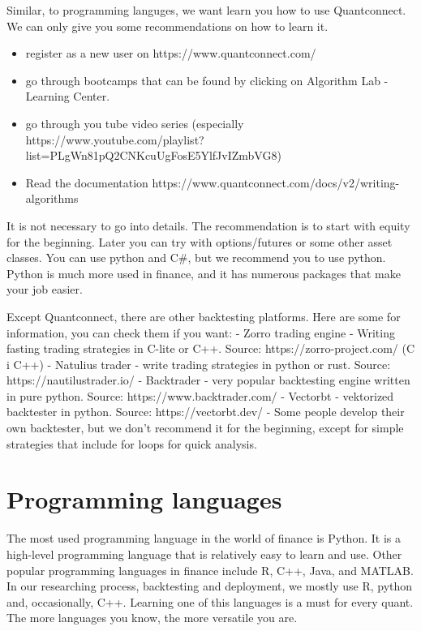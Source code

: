 \documentclass[
  letterpaper,
  DIV=11,
  numbers=noendperiod]{scrreprt}
\providecommand{\tightlist}{%
  \setlength{\itemsep}{0pt}\setlength{\parskip}{0pt}}\usepackage{longtable,booktabs,array}
\begin{document}
Similar, to programming languges, we want learn you how to use
Quantconnect. We can only give you some recommendations on how to learn
it.

\begin{itemize}
\tightlist
\item
  register as a new user on https://www.quantconnect.com/
\item
  go through bootcamps that can be found by clicking on Algorithm Lab -
  Learning Center.
\item
  go through you tube video series (especially
  https://www.youtube.com/playlist?list=PLgWn81pQ2CNKcuUgFosE5YlfJvIZmbVG8)
\item
  Read the documentation
  https://www.quantconnect.com/docs/v2/writing-algorithms
\end{itemize}

It is not necessary to go into details. The recommendation is to start
with equity for the beginning. Later you can try with options/futures or
some other asset classes. You can use python and C\#, but we recommend
you to use python. Python is much more used in finance, and it has
numerous packages that make your job easier.

Except Quantconnect, there are other backtesting platforms. Here are
some for information, you can check them if you want: - Zorro trading
engine - Writing fasting trading strategies in C-lite or C++. Source:
https://zorro-project.com/ (C i C++) - Natulius trader - write trading
strategies in python or rust. Source: https://nautilustrader.io/ -
Backtrader - very popular backtesting engine written in pure python.
Source: https://www.backtrader.com/ - Vectorbt - vektorized backtester
in python. Source: https://vectorbt.dev/ - Some people develop their own
backtester, but we don't recommend it for the beginning, except for
simple strategies that include for loops for quick analysis.

\section{Programming languages}\label{programming-languages}

The most used programming language in the world of finance is Python. It
is a high-level programming language that is relatively easy to learn
and use. Other popular programming languages in finance include R, C++,
Java, and MATLAB. In our researching process, backtesting and
deployment, we mostly use R, python and, occasionally, C++. Learning one
of this languages is a must for every quant. The more languages you
know, the more versatile you are.
\end{document}
